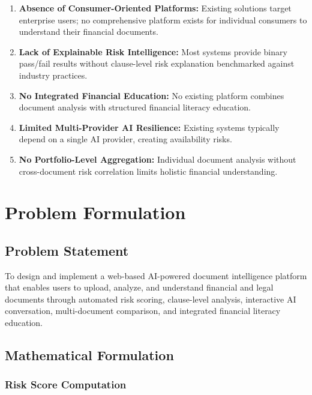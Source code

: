 \documentclass[12pt,a4paper,oneside]{report}
\begin{document}
\begin{enumerate}[leftmargin=2cm]
  \item \textbf{Absence of Consumer-Oriented Platforms:} Existing solutions target enterprise users; no comprehensive platform exists for individual consumers to understand their financial documents.
  \item \textbf{Lack of Explainable Risk Intelligence:} Most systems provide binary pass/fail results without clause-level risk explanation benchmarked against industry practices.
  \item \textbf{No Integrated Financial Education:} No existing platform combines document analysis with structured financial literacy education.
  \item \textbf{Limited Multi-Provider AI Resilience:} Existing systems typically depend on a single AI provider, creating availability risks.
  \item \textbf{No Portfolio-Level Aggregation:} Individual document analysis without cross-document risk correlation limits holistic financial understanding.
\end{enumerate}

\chapter{Problem Formulation}

\section{Problem Statement}

To design and implement a web-based AI-powered document intelligence platform that enables users to upload, analyze, and understand financial and legal documents through automated risk scoring, clause-level analysis, interactive AI conversation, multi-document comparison, and integrated financial literacy education.

\section{Mathematical Formulation}

\subsection{Risk Score Computation}
\end{document}
